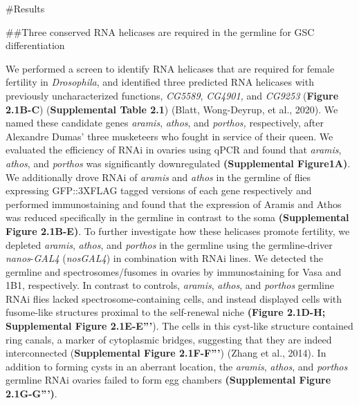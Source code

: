 \documentclass[12pt,twoside]{reedthesis}
\begin{document}
\#Results

\#\#Three conserved RNA helicases are required in the germline for GSC differentiation

We performed a screen to identify RNA helicases that are required for
female fertility in \emph{Drosophila}, and identified three predicted RNA
helicases with previously uncharacterized functions, \emph{CG5589}, \emph{CG4901,}
and \emph{CG9253} (\textbf{Figure 2.1B-C}) (\textbf{Supplemental Table 2.1})
(Blatt, Wong-Deyrup, et al., 2020). We named these candidate genes
\emph{aramis}, \emph{athos}, and \emph{porthos,} respectively, after Alexandre Dumas'
three musketeers who fought in service of their queen. We evaluated the
efficiency of RNAi in ovaries using qPCR and found that \emph{aramis},
\emph{athos}, and \emph{porthos} was significantly downregulated \textbf{(Supplemental Figure1A)}.
We additionally drove RNAi of \emph{aramis} and \emph{athos} in the germline of
flies expressing GFP::3XFLAG tagged versions of each gene respectively
and performed immunostaining and found that the expression of Aramis and
Athos was reduced specifically in the germline in contrast to the soma
\textbf{(Supplemental Figure 2.1B-E)}. To further investigate how these helicases promote
fertility, we depleted \emph{aramis}, \emph{athos}, and \emph{porthos} in the germline
using the germline-driver \emph{nanos}-\emph{GAL4} (\emph{nosGAL4}) in combination with
RNAi lines. We detected the germline and spectrosomes/fusomes in ovaries
by immunostaining for Vasa and 1B1, respectively. In contrast to
controls, \emph{aramis}, \emph{athos}, and \emph{porthos} germline RNAi flies lacked
spectrosome-containing cells, and instead displayed cells with
fusome-like structures proximal to the self-renewal niche \textbf{(Figure
2.1D-H; Supplemental Figure 2.1E-E'''}). The cells in this cyst-like structure
contained ring canals, a marker of cytoplasmic bridges, suggesting that
they are indeed interconnected (\textbf{Supplemental Figure 2.1F-F'''}) (Zhang et al., 2014).
In addition to forming cysts in an aberrant location, the \emph{aramis},
\emph{athos}, and \emph{porthos} germline RNAi ovaries failed to form egg chambers
\textbf{(Supplemental Figure 2.1G-G''')}.
\end{document}
